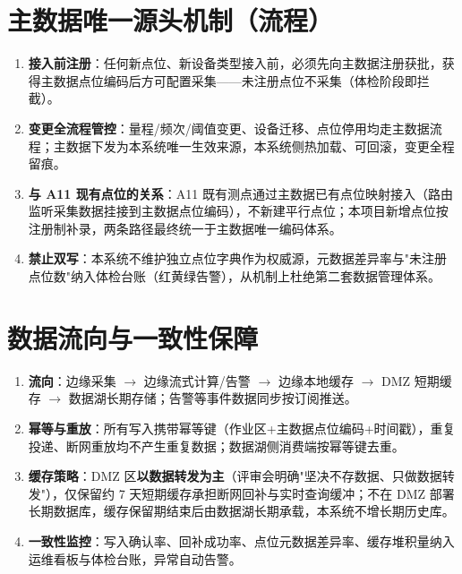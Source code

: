 \documentclass[11pt,a4paper]{ctexart}
\begin{document}
\section{主数据唯一源头机制（流程）}

\begin{enumerate}[leftmargin=*]
  \item \textbf{接入前注册}：任何新点位、新设备类型接入前，必须先向主数据注册获批，获得主数据点位编码后方可配置采集——未注册点位不采集（体检阶段即拦截）。
  \item \textbf{变更全流程管控}：量程/频次/阈值变更、设备迁移、点位停用均走主数据流程；主数据下发为本系统唯一生效来源，本系统侧热加载、可回滚，变更全程留痕。
  \item \textbf{与 A11 现有点位的关系}：A11 既有测点通过主数据已有点位映射接入（路由监听采集数据挂接到主数据点位编码），不新建平行点位；本项目新增点位按注册制补录，两条路径最终统一于主数据唯一编码体系。
  \item \textbf{禁止双写}：本系统不维护独立点位字典作为权威源，元数据差异率与"未注册点位数"纳入体检台账（红黄绿告警），从机制上杜绝第二套数据管理体系。
\end{enumerate}

\section{数据流向与一致性保障}

\begin{enumerate}[leftmargin=*]
  \item \textbf{流向}：边缘采集 $\rightarrow$ 边缘流式计算/告警 $\rightarrow$ 边缘本地缓存 $\rightarrow$ DMZ 短期缓存 $\rightarrow$ 数据湖长期存储；告警等事件数据同步按订阅推送。
  \item \textbf{幂等与重放}：所有写入携带幂等键（作业区+主数据点位编码+时间戳），重复投递、断网重放均不产生重复数据；数据湖侧消费端按幂等键去重。
  \item \textbf{缓存策略}：DMZ 区\textbf{以数据转发为主}（评审会明确"坚决不存数据、只做数据转发"），仅保留约 7 天短期缓存承担断网回补与实时查询缓冲；不在 DMZ 部署长期数据库，缓存保留期结束后由数据湖长期承载，本系统不增长期历史库。
  \item \textbf{一致性监控}：写入确认率、回补成功率、点位元数据差异率、缓存堆积量纳入运维看板与体检台账，异常自动告警。
\end{enumerate}

\end{document}
